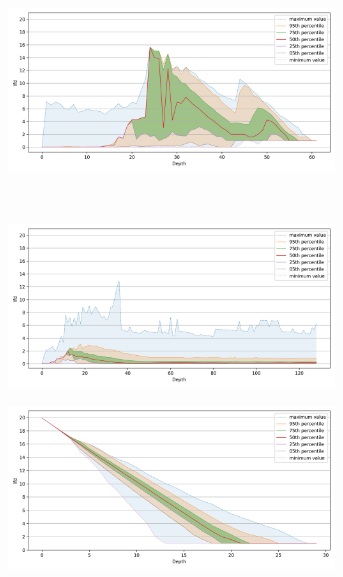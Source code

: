 \begin{figure}
\begin{subfigure}[b]{0.47\textwidth}
        \label{fig:results:sift-lfd}
    \end{subfigure}%
    \begin{subfigure}[b]{0.47\textwidth}
        \includegraphics[width=0.95\textwidth]{images/lfd/radio-ml-97920.png}\\
        \label{fig:results:radioml-lfd}
    \end{subfigure}%
    \\
    \begin{subfigure}[b]{0.47\textwidth}
        \includegraphics[width=0.95\textwidth]{images/lfd/silva-2224640.png}\\
        \label{fig:results:silva-lfd}
    \end{subfigure}%
    \begin{subfigure}[b]{0.47\textwidth}
        \includegraphics[width=0.95\textwidth]{images/lfd/random-1000000.png}\\

\end{subfigure}
\end{figure}
